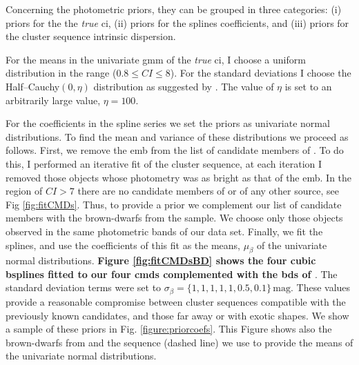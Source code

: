 Concerning the photometric priors, they can be grouped in three categories: (i) priors for the the \emph{true} \gls{ci}, (ii) priors for the splines coefficients, and (iii) priors for the cluster sequence intrinsic dispersion. 

For the means in the univariate \gls{gmm} of the \emph{true} \gls{ci}, I choose a uniform distribution in the range  ($0.8\leq CI \leq8$). For the standard deviations I choose the Half--Cauchy$(0,\eta)$ distribution as suggested by \citet{Gelman2006}. The value of $\eta$ is set to an arbitrarily large value, $\eta=100$.

For the coefficients in the spline series we set the priors as univariate normal distributions. To find the mean and variance of these distributions we proceed as follows. First, we remove the \gls{emb} from the list of candidate members of \citet{Bouy2015}. To do this, I performed an iterative fit of the cluster sequence, at each iteration I removed those objects whose photometry was  as bright as that of the \gls{emb}. In the region of $CI > 7$ there are no candidate members of \citet{Bouy2015} or of any other source, see Fig \ref{fig:fitCMDs}. Thus, to provide a prior we complement our list of candidate members with the brown-dwarfs from the \citet{Faherty2012} sample. We choose only those objects observed in the same photometric bands of our data set. Finally, we fit the splines, and use the coefficients of this fit as the means, $\mu_{\beta}$ of the univariate normal distributions. \textbf{Figure \ref{fig:fitCMDsBD} shows the four cubic \glspl{bspline} fitted to our four \glspl{cmd} complemented with the \glspl{bd} of \citet{Faherty2012}}. The standard deviation terms were set to $\sigma_{\beta}=\{1,1,1,1,1,0.5,0.1\}\,\mathrm{mag}$. These values provide a reasonable compromise between cluster sequences compatible with the previously known candidates, and those far away or with exotic shapes. We show a sample of these priors in Fig. \ref{figure:priorcoefs}. This Figure shows also the brown-dwarfs from \citet{Faherty2012} and the sequence (dashed line) we use to provide the means of the univariate normal distributions.

